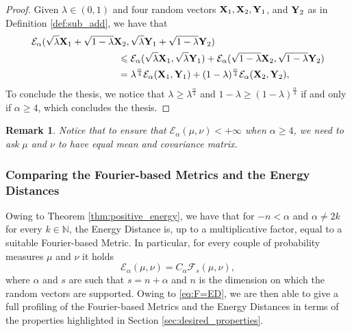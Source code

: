 \documentclass{article}
\renewcommand{\le}{\leqslant}
\renewcommand{\ge}{\geqslant}
\def\bX{{\bf X}}
\def\bY{{\bf Y}}
\def \enne{\mathbb{N}}
\newtheorem{remark}{Remark}
\newtheorem{proof}{Proof}
\begin{document}
\begin{proof}
    Given $\lambda\in(0,1)$ and four random vectors $\bX_1,\bX_2,\bY_1$, and $\bY_2$ as in Definition \ref{def:sub_add}, we have that
    \begin{align*}
        &\mathcal{E}_\alpha(\sqrt{\lambda}\bX_1+\sqrt{1-\lambda}\bX_2,\sqrt{\lambda}\bY_1+\sqrt{1-\lambda}\bY_2)\\
        &\quad\quad\quad\quad\quad\quad\quad\quad\quad\le\mathcal{E}_\alpha(\sqrt{\lambda}\bX_1,\sqrt{\lambda}\bY_1)+\mathcal{E}_\alpha(\sqrt{1-\lambda}\bX_2,\sqrt{1-\lambda}\bY_2)\\
        &\quad\quad\quad\quad\quad\quad\quad\quad\quad=\lambda^{\frac{\alpha}{4}}\mathcal{E}_\alpha(\bX_1,\bY_1)+(1-\lambda)^{\frac{\alpha}{4}}\mathcal{E}_\alpha(\bX_2,\bY_2),
    \end{align*}
    To conclude the thesis, we notice that $\lambda\ge\lambda^{\frac{\alpha}{4}}$ and $1-\lambda\ge(1-\lambda)^{\frac{\alpha}{4}}$ if and only if $\alpha\ge 4$, which concludes the thesis.
\end{proof}

\begin{remark}
    Notice that to ensure that $\mathcal{E}_\alpha(\mu,\nu)<+\infty$ when $\alpha \ge 4$, we need to ask $\mu$ and $\nu$ to have equal mean and covariance matrix.
\end{remark}




\subsubsection{Comparing the Fourier-based Metrics and the Energy Distances}

% 
Owing to Theorem \ref{thm:positive_energy}, we have that for $-n<\alpha$ and $\alpha\neq2k$ for every $k\in\enne$, the Energy Distance is, up to a multiplicative factor, equal to a suitable Fourier-based Metric.
% 
In particular, for every couple of probability measures $\mu$ and $\nu$ it holds
\begin{equation}
\label{eq:F=ED}
   \mathcal{E}_{\alpha}(\mu,\nu) = C_\alpha \mathcal{F}_s(\mu,\nu),
\end{equation}
where $\alpha$ and $s$ are such that $s=n+\alpha$ and $n$ is the dimension on which the random vectors are supported.
% 
Owing to \eqref{eq:F=ED}, we are then able to give a full profiling of the Fourier-based Metrics and the Energy Distances in terms of the properties highlighted in Section \ref{sec:desired_properties}.
\end{document}

